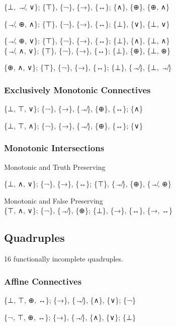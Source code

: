 \{⊥, ↛, ∨\}; \{⊤\}, \{¬\}, \{→\}, \{↔\}; \{∧\}, \{⊕\}, \{⊕, ∧\}

\{↛, ⊕, ∧\}; \{⊤\}, \{¬\}, \{→\}, \{↔\}; \{⊥\}, \{∨\}, \{⊥, ∨\}

\{↛, ⊕, ∨\}; \{⊤\}, \{¬\}, \{→\}, \{↔\}; \{⊥\}, \{∧\}, \{⊥, ∧\}\\
\{↛, ∧, ∨\}; \{⊤\}, \{¬\}, \{→\}, \{↔\}; \{⊥\}, \{⊕\}, \{⊥, ⊕\}

\{⊕, ∧, ∨\}; \{⊤\}, \{¬\}, \{→\}, \{↔\}; \{⊥\}, \{↛\}, \{⊥, ↛\}

\hypertarget{exclusively-monotonic-connectives}{%
\subsubsection{\texorpdfstring{Exclusively Monotonic Connectives
}{Exclusively Monotonic Connectives }}\label{exclusively-monotonic-connectives}}

\{⊥, ⊤, ∨\}; \{¬\}, \{→\}, \{↛\}, \{⊕\}, \{↔\}; \{∧\}

\{⊥, ⊤, ∧\}; \{¬\}, \{→\}, \{↛\}, \{⊕\}, \{↔\}; \{∨\}

\hypertarget{monotonic-intersections}{%
\subsubsection{Monotonic Intersections}\label{monotonic-intersections}}

Monotonic and Truth Preserving

\{⊥, ∧, ∨\}; \{¬\}, \{→\}, \{↔\}; \{⊤\}, \{↛\}, \{⊕\}, \{↛, ⊕\}

Monotonic and False Preserving\\
\{⊤, ∧, ∨\}; \{¬\}, \{↛\}, \{⊕\}; \{⊥\}, \{→\}, \{↔\}, \{→, ↔\}

\hypertarget{quadruples}{%
\subsection{Quadruples}\label{quadruples}}

16 functionally incomplete quadruples.

\hypertarget{affine-connectives-1}{%
\subsubsection{Affine Connectives}\label{affine-connectives-1}}

\{⊥, ⊤, ⊕, ↔\}; \{→\}, \{↛\}, \{∧\}, \{∨\}; \{¬\}

\{¬, ⊤, ⊕, ↔\}; \{→\}, \{↛\}, \{∧\}, \{∨\}; \{⊥\}

